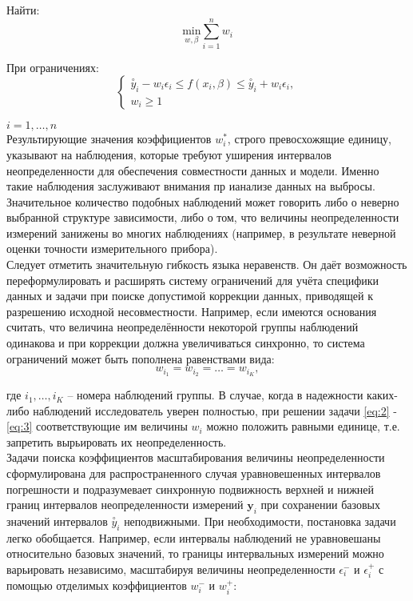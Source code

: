 Найти: \\
\begin{equation} \label{eq:2}
	\underset {w, \beta}{\text{min}} \sum\limits_{i=1}^{n} w_i
\end{equation} 

При ограничениях: \\

\begin{equation} \label{eq:3}
	\begin{cases}
		\stackrel{\circ}{y}_i - w_i \epsilon_i \leq f(x_i,\beta) \leq \stackrel{\circ}{y}_i + w_i \epsilon_i, \\
		w_i \geq 1 
	\end{cases}
\end{equation} 

$i = 1, \ldots, n$ \\

Результирующие значения коэффициентов $w_{i}^{*}$, строго превосхожящие единицу, указывают на наблюдения, которые требуют уширения интервалов неопределенности для обеспечения совместности данных и модели. Именно такие наблюдения заслуживают внимания пр ианализе данных на выбросы. Значительное количество подобных наблюдений может говорить либо о неверно выбранной структуре зависимости, либо о том, что величины неопределенности измерений занижены во многих наблюдениях (например, в результате неверной оценки точности измерительного прибора). \\
Следует отметить значительную гибкость языка неравенств. Он даёт возможность переформулировать и расширять систему ограничений для учёта специфики данных и задачи при поиске допустимой коррекции данных, приводящей к разрешению исходной несовместности. Например, если имеются основания считать, что величина неопределённости некоторой группы наблюдений одинакова и при коррекции должна увеличиваться синхронно, то система ограничений может быть пополнена равенствами вида: \\

\begin{equation*}
	w_{i_1} = w_{i_{2}} = \ldots = w_{i_K}, 
\end{equation*}

где $i_1, \ldots, i_K$ -- номера наблюдений группы. В случае, когда в надежности каких-либо наблюдений исследователь уверен полностью, при решении задачи \eqref{eq:2} - \eqref{eq:3} соответствующие им величины $w_i$ можно положить равными единице, т.е. запретить вырьировать их неопределенность. \\
Задачи поиска коэффициентов масштабирования величины неопределенности сформулирована для распространенного случая уравновешенных интервалов погрешности и подразумевает синхронную подвижность верхней и нижней границ интервалов неопределенности измерений $\bm{y}_i$ при сохранении базовых значений интервалов $\stackrel{\circ}{y}_i$ неподвижными. При необходимости, постановка задачи легко обобщается. Например, если интервалы наблюдений не уравновешаны относительно базовых значений, то границы интервальных измерений можно варьировать независимо, масштабируя величины неопределенности $\epsilon_i^{-}$ и $\epsilon_{i}^{+}$ с помощью отделимых коэффициентов $w_i^{-}$ и $w_{i}^{+}$: \\

